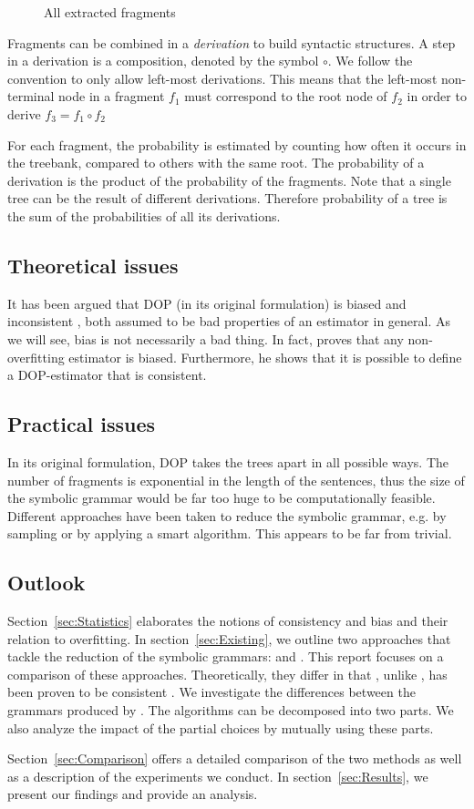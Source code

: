 \begin{figure}[h!]
\center 
\caption{All extracted fragments}
\label{f:fragments}
\end{figure}


Fragments can be combined in a \emph{derivation} to build syntactic structures. A step in a derivation is a composition, denoted by the symbol $\circ$. We follow the convention to only allow left-most derivations. This means that the left-most non-terminal node in a fragment $f_1$ must correspond to the root node of $f_2$ in order to derive $f_3=f_1\circ f_2$

For each fragment, the probability is estimated by counting how often it occurs in the treebank, compared to others with the same root. The probability of a derivation is the product of the probability of the fragments. Note that a single tree can be the result of different derivations. Therefore probability of a tree is the sum of the probabilities of all its derivations.

\subsection{Theoretical issues}
It has been argued that DOP (in its original formulation) is biased and inconsistent \cite{johnson2002}, both assumed to be bad properties of an estimator in general. As we will see, bias is not necessarily a bad thing. In fact, \cite{zollmann2005} proves that any non-overfitting estimator is biased. Furthermore, he shows that it is possible to define a DOP-estimator that is consistent.


\subsection{Practical issues}
In its original formulation, DOP takes the trees apart in all possible ways. The number of fragments is exponential in the length of the sentences, thus the size of the symbolic grammar would be far too huge to be computationally feasible. 
Different approaches have been taken to reduce the symbolic grammar, e.g. by sampling or by applying a smart algorithm. This appears to be far from trivial.


\subsection{Outlook}
Section~\ref{sec:Statistics} elaborates the notions of consistency and bias and their relation to overfitting.
In section~\ref{sec:Existing}, we outline two approaches that tackle the reduction of the symbolic grammars: \ddop{} and \dops{}. This report focuses on a comparison of these approaches. Theoretically, they differ in that \dops{}, unlike \ddop{}, has been proven to be consistent \cite{zollmann2005}. We investigate the differences between the grammars produced by \ddop{} \dops{}. The algorithms can be decomposed into two parts. We also analyze the impact of the partial choices by mutually using these parts.

Section~\ref{sec:Comparison} offers a detailed comparison of the two methods as well as a description of the experiments we conduct. In section~\ref{sec:Results}, we present our findings and provide an analysis. 


